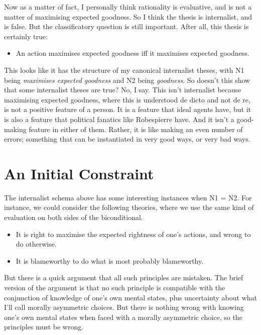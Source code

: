 Now as a matter of fact, I personally think rationality is evaluative, and is not a matter of maximising expected goodness. So I think the thesis is internalist, and is false. But the classificatory question is still important. After all, this thesis is certainly true:

\begin{itemize}
\item{} An action maximises expected goodness iff it maximises expected goodness.

\end{itemize}
This looks like it has the structure of my canonical internalist theses, with N1 being \emph{maximises expected goodness} and N2 being \emph{goodness}. So doesn't this show that some internalist theses are true? No, I say. This isn't internalist because maximising expected goodness, where this is understood de dicto and not de re, is not a positive feature of a person. It is a feature that ideal agents have, but it is also a feature that political fanatics like \gls{Robespierre} have. And it isn't a good-making feature in either of them. Rather, it is like making an even number of errors; something that can be instantiated in very good ways, or very bad ways.

\section{An Initial Constraint}
\label{aninitialconstraint}

The internalist schema above has some interesting instances when N1 = N2. For instance, we could consider the following theories, where we use the same kind of evaluation on both sides of the biconditional.

\begin{itemize}
\item{} It is right to maximise the expected rightness of one's actions, and wrong to do otherwise.

\item{} It is blameworthy to do what is most probably blameworthy.

\end{itemize}
But there is a quick argument that all such principles are mistaken. The brief version of the argument is that no such principle is compatible with the conjunction of knowledge of one's own mental states, plus uncertainty about what I'll call morally asymmetric choices. But there is nothing wrong with knowing one's own mental states when faced with a morally asymmetric choice, so the principles must be wrong.

